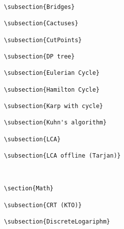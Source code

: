 {\begin{verbatim}
\subsection{Bridges}

\subsection{Cactuses}

\subsection{CutPoints}

\subsection{DP tree}

\subsection{Eulerian Cycle}

\subsection{Hamilton Cycle}

\subsection{Karp with cycle}

\subsection{Kuhn's algorithm}

\subsection{LCA}

\subsection{LCA offline (Tarjan)}



\section{Math}

\subsection{CRT (KTO)}

\subsection{DiscreteLogariphm}


\end{verbatim}}
